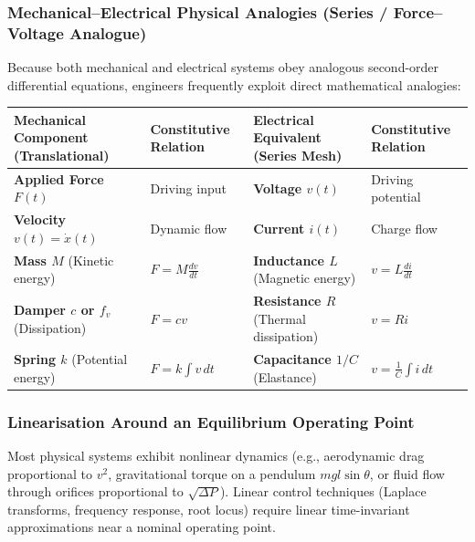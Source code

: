 \documentclass[12pt,onecolumn,twoside ]{article}
\begin{document}
	\subsubsection{Mechanical–Electrical Physical Analogies (Series / Force–Voltage Analogue)}
	Because both mechanical and electrical systems obey analogous second-order differential equations, engineers frequently exploit direct mathematical analogies:
	\begin{center}\small\begin{tabularx}{\textwidth}{*{4}{Y}}
			\toprule
			\textbf{Mechanical Component (Translational)} & \textbf{Constitutive Relation} & \textbf{Electrical Equivalent (Series Mesh)} & \textbf{Constitutive Relation} \\
			\midrule
			\textbf{Applied Force $F(t)$} & Driving input & \textbf{Voltage $v(t)$} & Driving potential \\
			\textbf{Velocity $v(t) = \dot{x}(t)$} & Dynamic flow & \textbf{Current $i(t)$} & Charge flow \\
			\textbf{Mass $M$} (Kinetic energy) & $F = M \frac{dv}{dt}$ & \textbf{Inductance $L$} (Magnetic energy) & $v = L \frac{di}{dt}$ \\
			\textbf{Damper $c$ or $f_v$} (Dissipation) & $F = c v$ & \textbf{Resistance $R$} (Thermal dissipation) & $v = R i$ \\
			\textbf{Spring $k$} (Potential energy) & $F = k \int v\, dt$ & \textbf{Capacitance $1/C$} (Elastance) & $v = \frac{1}{C}\int i\, dt$ \\
			\bottomrule
	\end{tabularx}\end{center}
	
	\subsubsection{Linearisation Around an Equilibrium Operating Point}
	Most physical systems exhibit nonlinear dynamics (e.g., aerodynamic drag proportional to $v^2$, gravitational torque on a pendulum $mgl \sin\theta$, or fluid flow through orifices proportional to $\sqrt{\Delta P}$). Linear control techniques (Laplace transforms, frequency response, root locus) require linear time-invariant approximations near a nominal operating point.
\end{document}
